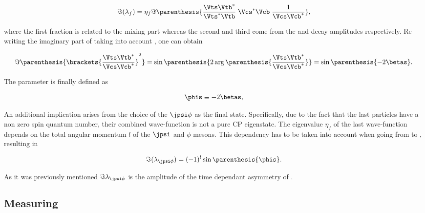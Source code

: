\begin{equation}
  \centering
 \Im(\lambda_f) = \eta_f \Im\parenthesis{ \frac{\Vts\Vtb^*}{\Vts^*\Vtb} \; \Vcs^*\Vcb \; \frac{1}{\Vcs\Vcb^*} },
 \label{lambdaf_ckm}
\end{equation}

\noindent where the first fraction is related to the mixing part \qoverp whereas the second and third come from the \Bsb and \Bs
decay amplitudes respectively. Re-writing the imaginary part of  taking into account ,
one can obtain 

\begin{equation}
  \centering
  \Im\parenthesis{ \brackets{ \frac{\Vts\Vtb^*}{\Vcs\Vcb^*}}^2 } =
  \sin \parenthesis{2 \arg \parenthesis{\frac{\Vts\Vtb^*}{\Vcs\Vcb^*}}} =
  \sin \parenthesis{-2\betas}.
 \label{lambda_ckm_manip}
\end{equation}

\noindent The parameter \phis is finally defined as

\begin{equation}
  \centering
  \phis\equiv-2\betas,
 \label{phis_def}
\end{equation}

\noindent An additional implication arises from the choice of the $\jpsi\phi$ as the final state.
Specifically, due to the fact that the last particles have a non zero spin quantum number, their combined wave-function
is not a pure CP eigenstate. The eigenvalue $\eta_f$ of the last wave-function depends on the total angular momentum
$l$ of the $\jpsi$ and $\phi$ mesons. This dependency has to be taken into account when going from 
to , resulting in 

\begin{equation}
 \Im(\lambda_{\jpsi\phi}) = (-1)^l\sin\parenthesis{\phis}.
 \label{phis_jpsiphi_def}
\end{equation}

\noindent As it was previously mentioned $\Im\lambda_{\jpsi\phi}$ is the amplitude of the time dependant asymmetry of .


\subsection{Measuring \phis}
\label{measuring_phis}

